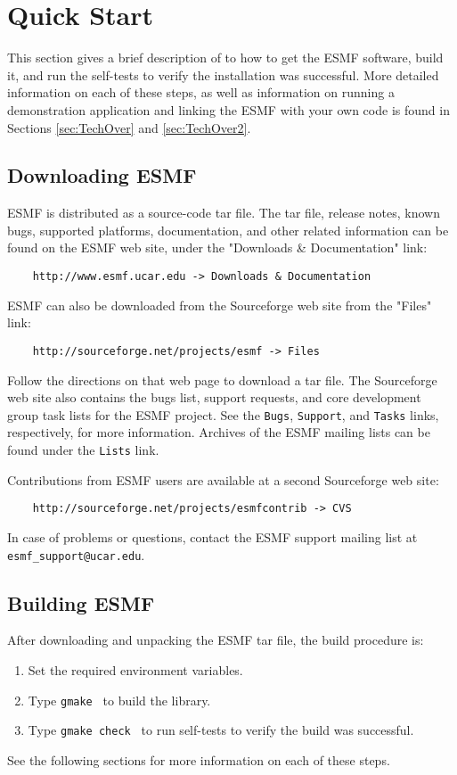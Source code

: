 \section{Quick Start}
\label{sec:QuickStart}

This section gives a brief
description of to how to get the ESMF software, build it, 
and run the self-tests to verify the installation was successful.
More detailed information on each of these steps, as well as
information on running a demonstration application and linking
the ESMF with your own code is found in Sections \ref{sec:TechOver} 
and \ref{sec:TechOver2}.  

\subsection{Downloading ESMF}

ESMF is distributed as a source-code tar file.  The tar file, release notes, 
known bugs, supported platforms, documentation, and other related information 
can be found on the ESMF web site, under the "Downloads \& Documentation" link:
\begin{verbatim}
    http://www.esmf.ucar.edu -> Downloads & Documentation
\end{verbatim}
ESMF can also be downloaded from the Sourceforge web site
from the "Files" link:
\begin{verbatim}
    http://sourceforge.net/projects/esmf -> Files
\end{verbatim}
Follow the directions on that web page to download a tar file.  
The Sourceforge web site also contains 
the bugs list, support requests, and core development group task
lists for the ESMF project.
See the {\tt Bugs}, {\tt Support}, and {\tt Tasks} links, respectively,
for more information.  Archives of the ESMF mailing lists can be
found under the {\tt Lists} link.

Contributions from ESMF users are available at a second Sourceforge web site:
\begin{verbatim}
    http://sourceforge.net/projects/esmfcontrib -> CVS
\end{verbatim}
In case of problems or questions, contact the ESMF support mailing
list at {\tt esmf\_support@ucar.edu}.


\subsection{Building ESMF}

After downloading and unpacking the ESMF tar file, the build procedure is:
\begin{enumerate}
\item Set the required environment variables. 
\item Type {\tt gmake } to build the library.
\item Type {\tt gmake check } to run self-tests to verify
the build was successful.
\end{enumerate}
See the following sections for more information on each of these steps.

